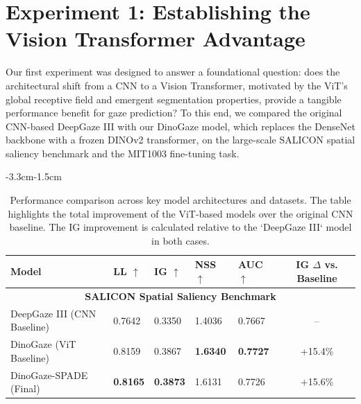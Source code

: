 \section{Experiment 1: Establishing the Vision Transformer Advantage}
\label{sec:results_exp1}
Our first experiment was designed to answer a foundational question: does the architectural shift from a CNN to a Vision Transformer, motivated by the ViT's global receptive field and emergent segmentation properties, provide a tangible performance benefit for gaze prediction? To this end, we compared the original CNN-based DeepGaze III with our DinoGaze model, which replaces the DenseNet backbone with a frozen DINOv2 transformer, on the large-scale SALICON spatial saliency benchmark and the MIT1003 fine-tuning task.
\begin{table}[h!]
\begin{adjustwidth}{-3.3cm}{-1.5cm} 
\centering
{ %
\small %
\setlength{\tabcolsep}{4pt} %

\caption{
    Performance comparison across key model architectures and datasets. 
    The table highlights the total improvement of the ViT-based models over the original CNN baseline.
    The IG improvement is calculated relative to the `DeepGaze III` model in both cases.
}
\label{tab:VIT_results}
\begin{tabular}{@{}l l l l l c@{}}
    \toprule
    \textbf{Model} & \textbf{LL} $\uparrow$ & \textbf{IG} $\uparrow$ & \textbf{NSS} $\uparrow$ & \textbf{AUC} $\uparrow$ & \textbf{IG $\Delta$ vs. Baseline} \\
    \midrule
    
    \multicolumn{6}{c}{\textbf{SALICON Spatial Saliency Benchmark}} \\
    \midrule
    DeepGaze III (CNN Baseline) & 0.7642 & 0.3350 & 1.4036 & 0.7667 & -- \\
    DinoGaze (ViT Baseline)     & 0.8159 & 0.3867 & \bfseries 1.6340 & \bfseries 0.7727 & +15.4\% \\
    DinoGaze-SPADE (Final)      & \bfseries 0.8165 & \bfseries 0.3873 & 1.6131 & 0.7726 & +15.6\% \\
    \midrule


\end{tabular}}
\end{adjustwidth}
\end{table}

